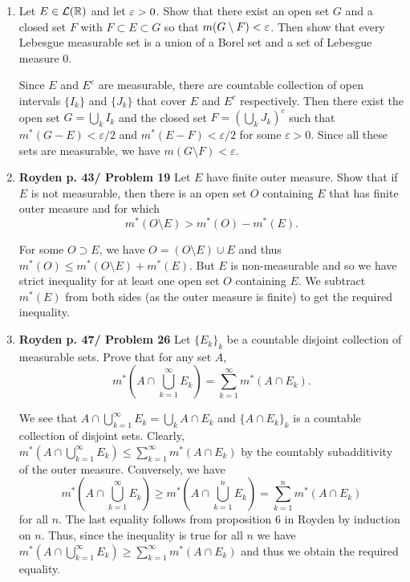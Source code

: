 \documentclass[12pt]{article}
\begin{document}
\begin{enumerate}
    
    
    \item Let $E \in \mathcal{L}(\mathbb{R})$ and let $\varepsilon > 0$. Show that there exist an open set $G$ and a closed set $F$ with $F \subset E \subset G$ so that $m(G \setminus F) < \varepsilon$. Then show that every Lebesgue measurable set is a union of a Borel set and a set of Lebesgue measure 0. 
    \begin{mybox}
        Since $E$ and $E^c$ are measurable, there are
        countable collection of open intervals $\{I_k\}$
        and $\{J_k\}$ that cover $E$ and $E^c$
        respectively. Then there exist the open set
        $G=\bigcup_k{I_k}$ and the closed set $F=\left(
        \bigcup_k{J_k}\right)^c$ such that $m^*(G-E)
        <\varepsilon/2$ and $m^*(E-F)<\varepsilon/2$
        for some $\varepsilon>0$.
        Since all these sets are measurable, we have
        $m(G\setminus F)<\varepsilon$.
    \end{mybox}
    
    \item \textbf{Royden p. 43/ Problem 19}
    Let $E$ have finite outer measure. Show that if $E$ is not measurable, then there is an open set
    $O$ containing $E$ that has finite outer measure and for which
    $$m^*(O\setminus E)>m^*(O)-m^*(E).$$
    \begin{mybox}
        For some $O \supset E$, we have
        $O=(O\setminus E)\cup E$ and thus
        $m^*(O)\leq m^*(O\setminus E)+m^*(E)$. But
        $E$ is non-measurable and so we have strict
        inequality for at least one open set $O$ containing
        $E$. We subtract $m^*(E)$ from both sides
        (as the outer measure is finite) to get the
        required inequality.
    \end{mybox}

    \item \textbf{Royden p. 47/ Problem 26}
    Let $\{E_k\}_k$ be a countable disjoint collection of measurable sets. Prove that for any set $A$,
    $$m^*\left(A\cap \bigcup_{k=1}^\infty{E_k}\right)
    =\sum_{k=1}^{\infty}{m^*(A\cap E_k)}.$$
    \begin{mybox}
        We see that $A\cap \bigcup_{k=1}^\infty{E_k}=\bigcup_k{A\cap E_k}$
        and $\{A\cap E_k\}_k$ is a countable
        collection of disjoint sets. Clearly,
        $m^*\left(A\cap \bigcup_{k=1}^\infty{E_k}\right)
        \leq\sum_{k=1}^{\infty}{m^*(A\cap E_k)}$ by the
        countably subadditivity of the outer measure.
        Conversely, we have
        $$m^*\left(A\cap \bigcup_{k=1}^\infty{E_k}\right)
        \geq m^*\left(A\cap \bigcup_{k=1}^n{E_k}\right)
        =\sum_{k=1}^{n}m^*\left(A\cap {E_k}\right)$$
        for all $n$. The last equality follows from proposition 6
        in Royden by induction on $n$. Thus, since
        the inequality is true for all $n$ we have
        $m^*\left(A\cap \bigcup_{k=1}^\infty{E_k}\right)
        \geq\sum_{k=1}^{\infty}{m^*(A\cap E_k)}$ and 
        thus we obtain
        the required equality.
    \end{mybox}
    

\end{enumerate}
\end{document}
